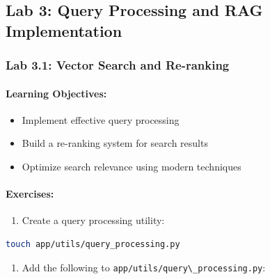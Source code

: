 \documentclass[
  screen,review,acmlarge]{acmart}
\newcommand{\passthrough}[1]{#1}
\providecommand{\tightlist}{%
  \setlength{\itemsep}{0pt}\setlength{\parskip}{0pt}}
\begin{document}
\subsection{Lab 3: Query Processing and RAG Implementation}\label{lab-3-query-processing-and-rag-implementation}

\subsubsection{Lab 3.1: Vector Search and Re-ranking}\label{lab-3.1-vector-search-and-re-ranking}

\paragraph{Learning Objectives:}\label{learning-objectives-4}

\begin{itemize}
\tightlist
\item
  Implement effective query processing
\item
  Build a re-ranking system for search results
\item
  Optimize search relevance using modern techniques
\end{itemize}

\paragraph{Exercises:}\label{exercises-3}

\begin{enumerate}
\def\labelenumi{\arabic{enumi}.}
\tightlist
\item
  Create a query processing utility:
\end{enumerate}

\begin{lstlisting}[language=bash]
touch app/utils/query_processing.py
\end{lstlisting}

\begin{enumerate}
\def\labelenumi{\arabic{enumi}.}
\setcounter{enumi}{1}
\tightlist
\item
  Add the following to \passthrough{\lstinline!app/utils/query\_processing.py!}:
\end{enumerate}
\end{document}
